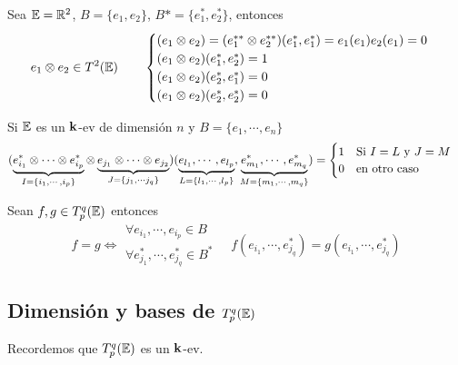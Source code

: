 \begin{example}
	Sea $\mathbb{E} = \mathbb{R}^2$, $B = \{e_1, e_2\}$, $B* = \{e_1^*, e_2^*\}$, entonces
	\[
		e_1 \otimes e_2 \in T^2(\mathbb{E}) \qquad \begin{cases}
			(e_1 \otimes e_2) = (e_1^{**} \otimes e_2^{**})(e_1^*,e_1^*) =
			e_1(e_1)e_2(e_1) = 0 \\
			(e_1 \otimes e_2)(e_1^*,e_2^*) = 1 \\
			(e_1 \otimes e_2)(e_2^*,e_1^*) = 0 \\
			(e_1 \otimes e_2)(e_2^*,e_2^*) = 0
		\end{cases}
	\]
\end{example}
\begin{obs}[a] \label{obs:tens_cero}
	Si $\mathbb{E}$ es un $\mathbf{k}$-ev de dimensión $n$ y $B = \{e_1, \cdots, e_n\}$
	\[
		(\underbrace{e_{i_1}^* \otimes \cdots \otimes e_{i_p}^*}_
		{I = \left\{i_1, \cdots, i_p\right\}} \otimes
		\underbrace{e_{j_1} \otimes \cdots \otimes e_{j_2}}_
		{J = \left\{j_1, \cdots j_q\right\}})(\underbrace{e_{l_1}, \cdots, e_{l_p}}_
		{L = \left\{l_1, \cdots, l_p\right\}}, \underbrace{e_{m_1}^*, \cdots, e_{m_q}^*}_
		{M = \left\{m_1, \cdots, m_q\right\}}) =
		\begin{cases}
			1 \quad \text{Si } I = L \text{ y } J = M \\
			0 \quad \text{en otro caso}
		\end{cases}
	\]
\end{obs}
\begin{obs}
	Sean $f,g \in T_p^q(\mathbb{E})$ entonces
	\[
		f=g \iff \substack{\forall e_{i_1}, \cdots, e_{i_p} \in B \\ \forall e_{j_1}^*, \cdots,
		e_{j_q}^* \in B^*} \quad f(e_{i_1}, \cdots, e_{j_q}^*) =
		g(e_{i_1}, \cdots, e_{j_q}^*)
	\]
\end{obs}

\subsection{Dimensión y bases de $T_p^q(\mathbb{E})$}

Recordemos que $T_p^q(\mathbb{E})$ es un $\mathbf{k}$-ev.

